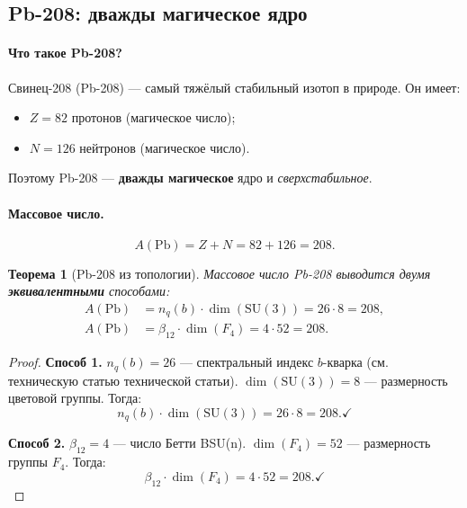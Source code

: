 \documentclass[11pt,a4paper]{article}
\newcommand{\SU}{\mathrm{SU}}
\newtheorem{theorem}{Теорема}[section]
\theoremstyle{definition}
\begin{document}
\subsection{Pb-208: дважды магическое ядро}
\label{subsec:pb208}

\paragraph{Что такое Pb-208?}
Свинец-208 (Pb-208) — самый тяжёлый стабильный изотоп 
в природе. Он имеет:
\begin{itemize}
    \item $Z = 82$ протонов (магическое число);
    \item $N = 126$ нейтронов (магическое число).
\end{itemize}
Поэтому Pb-208 — \textbf{дважды магическое} ядро и 
\emph{сверхстабильное}.

\paragraph{Массовое число.}
\begin{equation}
    A(\text{Pb}) = Z + N = 82 + 126 = 208.
\end{equation}

\begin{theorem}[Pb-208 из топологии]
\label{thm:pb208}
Массовое число Pb-208 выводится двумя \textbf{эквивалентными} 
способами:
\begin{align}
    A(\text{Pb}) &= n_q(b) \cdot \dim(\SU(3))
                  = 26 \cdot 8 = 208,
    \label{eq:pb208-1} \\[0.3em]
    A(\text{Pb}) &= \beta_{12} \cdot \dim(F_4)
                  = 4 \cdot 52 = 208.
    \label{eq:pb208-2}
\end{align}
\end{theorem}

\begin{proof}
\textbf{Способ 1.} $n_q(b) = 26$ — спектральный индекс 
$b$-кварка (см. техническую статью технической статьи). 
$\dim(\SU(3)) = 8$ — размерность цветовой группы. Тогда:
\begin{equation}
    n_q(b) \cdot \dim(\SU(3)) = 26 \cdot 8 = 208. \checkmark
\end{equation}

\medskip\noindent
\textbf{Способ 2.} $\beta_{12} = 4$ — число Бетти BSU(n). 
$\dim(F_4) = 52$ — размерность группы $F_4$. Тогда:
\begin{equation}
    \beta_{12} \cdot \dim(F_4) = 4 \cdot 52 = 208. \checkmark
\end{equation}
\end{proof}
\end{document}
